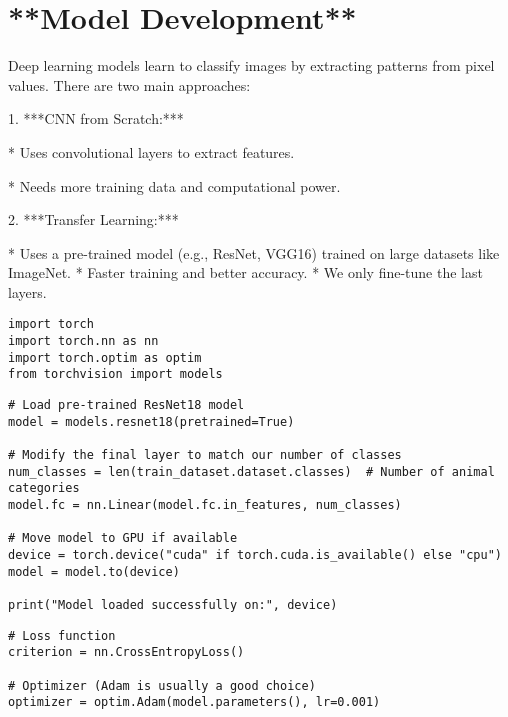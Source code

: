 \documentclass{article}
\begin{document}
\section{**Model Development**}

Deep learning models learn to classify images by extracting patterns from pixel values. There are two main approaches:

1. ***CNN from Scratch:***

*  Uses convolutional layers to extract features.

*  Needs more training data and computational power.

2.  ***Transfer Learning:***

*  Uses a pre-trained model (e.g., ResNet, VGG16) trained on large datasets like ImageNet.
*  Faster training and better accuracy.
*  We only fine-tune the last layers.

\begin{verbatim}
import torch
import torch.nn as nn
import torch.optim as optim
from torchvision import models
\end{verbatim}

\begin{verbatim}
# Load pre-trained ResNet18 model
model = models.resnet18(pretrained=True)

# Modify the final layer to match our number of classes
num_classes = len(train_dataset.dataset.classes)  # Number of animal categories
model.fc = nn.Linear(model.fc.in_features, num_classes)

# Move model to GPU if available
device = torch.device("cuda" if torch.cuda.is_available() else "cpu")
model = model.to(device)

print("Model loaded successfully on:", device)

\end{verbatim}

\begin{verbatim}
# Loss function
criterion = nn.CrossEntropyLoss()

# Optimizer (Adam is usually a good choice)
optimizer = optim.Adam(model.parameters(), lr=0.001)
\end{verbatim}
\end{document}
